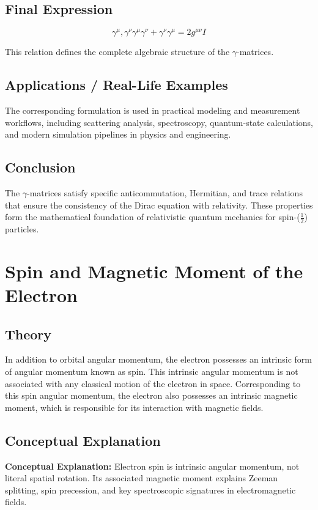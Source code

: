 \documentclass[12pt]{report}
\begin{document}
\subsection*{Final Expression}

\begin{equation*}
\boxed{
{ \gamma^\mu , \gamma^\nu }
\gamma^\mu \gamma^\nu + \gamma^\nu \gamma^\mu = 2g^{\mu\nu} I}
\end{equation*}

This relation defines the complete algebraic structure of the $\gamma$-matrices.

\subsection*{Applications / Real-Life Examples}
The corresponding formulation is used in practical modeling and measurement workflows, including scattering analysis, spectroscopy, quantum-state calculations, and modern simulation pipelines in physics and engineering.

\subsection*{Conclusion}

The $\gamma$-matrices satisfy specific anticommutation, Hermitian, and trace relations that ensure the consistency of the Dirac equation with relativity. These properties form the mathematical foundation of relativistic quantum mechanics for spin-($\tfrac{1}{2}$) particles.

\section{Spin and Magnetic Moment of the Electron}



\subsection*{Theory}

In addition to orbital angular momentum, the electron possesses an intrinsic form of angular momentum known as spin. This intrinsic angular momentum is not associated with any classical motion of the electron in space. Corresponding to this spin angular momentum, the electron also possesses an intrinsic magnetic moment, which is responsible for its interaction with magnetic fields.


\subsection{Conceptual Explanation}
\textbf{Conceptual Explanation:} Electron spin is intrinsic angular momentum, not literal spatial rotation. Its associated magnetic moment explains Zeeman splitting, spin precession, and key spectroscopic signatures in electromagnetic fields.
\end{document}
